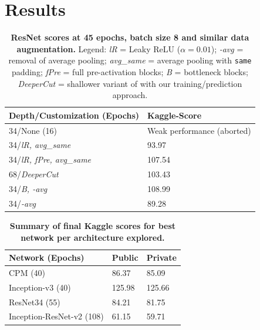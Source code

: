 \section{Results}
	\begin{table}
    	\centering
        \captionsetup{justification=centering}
        \begin{tabular}{@{}ll@{}}
        	\toprule
            \textbf{Depth/Customization (Epochs)} & \textbf{Kaggle-Score} \\
            \midrule
            34/None (16) & Weak performance (aborted) \\
            34/\emph{lR, avg\_same} & 93.97 \\
            34/\emph{lR, fPre, avg\_same} & 107.54 \\
            68/\emph{DeeperCut} & 103.43 \\
            34/\emph{B, -avg} & 108.99 \\
            34/\emph{-avg} & 89.28 \\
            \bottomrule
        \end{tabular}
        \caption{\textbf{ResNet scores at 45 epochs, batch size 8 and similar data augmentation.} Legend: \emph{lR} = Leaky ReLU ($\alpha = 0.01$); \emph{-avg} = removal of average pooling; \emph{avg\_same} = average pooling with \texttt{same} padding; \emph{fPre} = full pre-activation blocks; \emph{B} = bottleneck blocks; \emph{DeeperCut} = shallower variant of \cite{DBLP:journals/corr/InsafutdinovPAA16} with our training/prediction approach.\label{tab:resnet_summary}}
        \vspace*{-1.5\baselineskip}
	\end{table}
    \begin{table}
    	\centering
        \captionsetup{justification=centering}
        \begin{tabular}{@{}lll@{}}
        	\toprule
            \textbf{Network (Epochs)} & \textbf{Public}  & \textbf{Private} \\
            \midrule
            CPM (40) & 86.37 & 85.09 \\
            Inception-v3 (40) & 125.98 & 125.66 \\
            ResNet34 (55) & 84.21 & 81.75 \\
            Inception-ResNet-v2 (108) & 61.15 & 59.71 \\
            \bottomrule
        \end{tabular}
        \captionsetup{labelfont=bf}
        \caption{\textbf{Summary of final Kaggle scores for best network per architecture explored.}\label{tab:scores_summary}}
        \vspace*{-1.5\baselineskip}
	\end{table}


